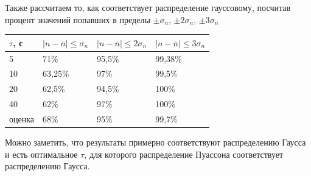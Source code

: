 \documentclass[12pt,a4paper]{article}
\begin{document}
Также рассчитаем то, как соответствует распределение гауссовому, посчитав процент значений попавших в пределы $\pm\sigma_n$, $\pm2\sigma_n$, $\pm3\sigma_n$
\begin{table}[!ht]
    \centering
    \begin{tabular}{|l|l|l|l|}
    \hline
        $\tau$, с & $\lvert n - \overline{n} \rvert  \leq \sigma_n$ & $\lvert n - \overline{n} \rvert  \leq 2\sigma_n$ & $\lvert n - \overline{n} \rvert  \leq 3\sigma_n$ \\ \hline
        5 & 71\% & 95,5\% & 99,38\% \\ \hline
        10 & 63,25\% & 97\% & 99,5\% \\ \hline
        20 & 62,5\% & 94,5\% & 100\% \\ \hline
        40 & 62\% & 97\% & 100\% \\ \hline
        \hline
        оценка & 68\% & 95\% & 99,7\% \\\hline
    \end{tabular}
\end{table}
Можно заметить, что результаты примерно соответствуют распределению Гаусса и есть оптимальное $\tau$, для которого распределение Пуассона соответствует распределению Гаусса.
\end{document}
